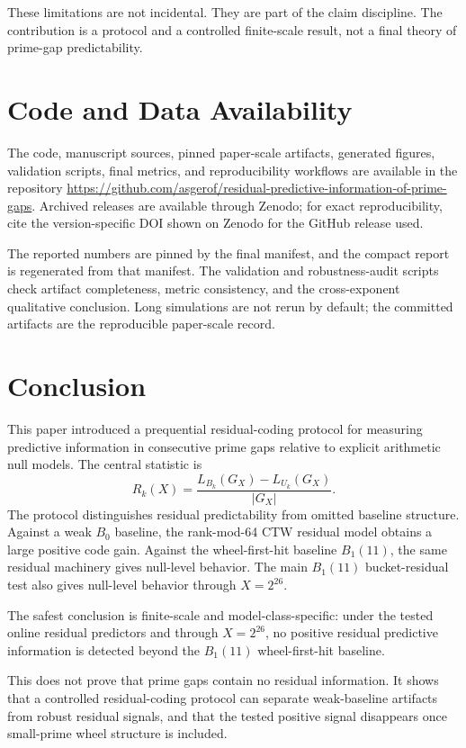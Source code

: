 \documentclass[11pt]{article}
\begin{document}
These limitations are not incidental. They are part of the claim discipline. The contribution is a protocol and a controlled finite-scale result, not a final theory of prime-gap predictability.

\section{Code and Data Availability}

The code, manuscript sources, pinned paper-scale artifacts, generated figures, validation scripts, final metrics, and reproducibility workflows are available in the repository \url{https://github.com/asgerof/residual-predictive-information-of-prime-gaps}. Archived releases are available through Zenodo; for exact reproducibility, cite the version-specific DOI shown on Zenodo for the GitHub release used.

The reported numbers are pinned by the final manifest, and the compact report is regenerated from that manifest. The validation and robustness-audit scripts check artifact completeness, metric consistency, and the cross-exponent qualitative conclusion. Long simulations are not rerun by default; the committed artifacts are the reproducible paper-scale record.

\section{Conclusion}

This paper introduced a prequential residual-coding protocol for measuring predictive information in consecutive prime gaps relative to explicit arithmetic null models. The central statistic is
\[
R_k(X)=\frac{L_{B_k}(G_X)-L_{U_k}(G_X)}{|G_X|}.
\]
The protocol distinguishes residual predictability from omitted baseline structure. Against a weak $B_0$ baseline, the rank-mod-64 CTW residual model obtains a large positive code gain. Against the wheel-first-hit baseline $B_1(11)$, the same residual machinery gives null-level behavior. The main $B_1(11)$ bucket-residual test also gives null-level behavior through $X=2^{26}$.

The safest conclusion is finite-scale and model-class-specific: under the tested online residual predictors and through $X=2^{26}$, no positive residual predictive information is detected beyond the $B_1(11)$ wheel-first-hit baseline.

This does not prove that prime gaps contain no residual information. It shows that a controlled residual-coding protocol can separate weak-baseline artifacts from robust residual signals, and that the tested positive signal disappears once small-prime wheel structure is included.



\end{document}
